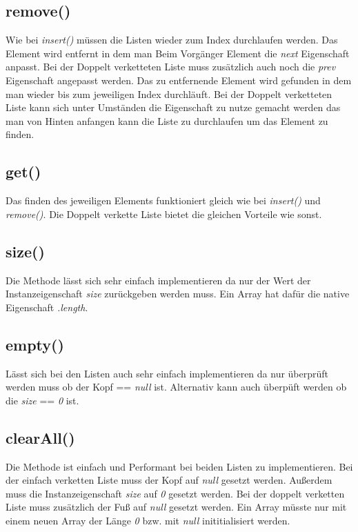 \documentclass[a4paper, 11pt]{article}
\begin{document}
\subsection*{remove()}
Wie bei \textit{insert()} müssen die Listen wieder zum Index durchlaufen werden. Das Element wird entfernt in dem man
Beim Vorgänger Element die \textit{next} Eigenschaft anpasst. Bei der Doppelt verketteten Liste muss zusätzlich auch
noch die \textit{prev} Eigenschaft angepasst werden. Das zu entfernende Element wird gefunden in dem man wieder bis zum
jeweiligen Index durchläuft. Bei der Doppelt verketteten Liste kann sich unter Umständen die Eigenschaft zu nutze
gemacht werden das man von Hinten anfangen kann die Liste zu durchlaufen um das Element zu finden.

\subsection*{get()}
Das finden des jeweiligen Elements funktioniert gleich wie bei \textit{insert()} und \textit{remove()}.
Die Doppelt verkette Liste bietet die gleichen Vorteile wie sonst.

\subsection*{size()}
Die Methode lässt sich sehr einfach implementieren da nur der Wert der Instanzeigenschaft \textit{size} zurückgeben
werden muss. Ein Array hat dafür die native Eigenschaft \textit{.length}.

\subsection*{empty()}
Lässt sich bei den Listen auch sehr einfach implementieren da nur überprüft werden muss ob der Kopf == \textit{null} ist.
Alternativ kann auch überpüft werden ob die \textit{size} == \textit{0} ist.

\subsection*{clearAll()}
Die Methode ist einfach und Performant bei beiden Listen zu implementieren. Bei der einfach verketten Liste muss der
Kopf auf \textit{null} gesetzt werden. Außerdem muss die Instanzeigenschaft \textit{size} auf \textit{0} gesetzt werden.
Bei der doppelt verketten Liste muss zusätzlich der Fuß auf \textit{null} gesetzt werden. Ein Array müsste nur mit einem
neuen Array der Länge \textit{0} bzw. mit \textit{null} inititialisiert werden.
\end{document}
